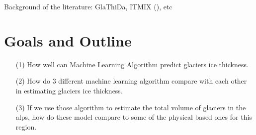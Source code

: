 Background of the literature: GlaThiDa, ITMIX (\citet{Farinotti2017}), etc 


\section{Goals and Outline}\label{goals}

%
\begin{itemize}
\item[(1)] How well can Machine Learning Algorithm predict glaciers ice thickness.
\item[(2)] How do 3 different machine learning algorithm compare with each other in estimating glaciers ice thickness.
\item[(3)] If we use those algorithm to estimate the total volume of glaciers in the alps, how do these model compare to some of the physical based ones for this region.
\end{itemize}

%
%
